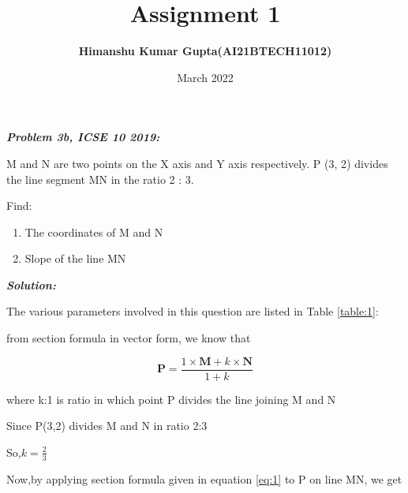 \documentclass[journal,12pt,twocolumn]{IEEEtran}
\begin{document}
\newcommand{\myvec}[1]{\ensuremath{\begin{pmatrix}#1\end{pmatrix}}}

\let\vec\mathbf


\title{Assignment 1}
\author{\textbf{Himanshu Kumar Gupta(AI21BTECH11012)}}
\maketitle
\date {March 2022}


\textbf{\textit{Problem 3b, ICSE 10 2019:}}


 M and N are two points on the X axis and Y axis respectively. 
P (3, 2) divides the line segment MN in the ratio 2 : 3.

Find:
\begin{enumerate}
    \item The coordinates of M and N
    \item Slope of the line MN
\end{enumerate}

\textbf{\textit{Solution:}}

	The various parameters involved in this question are listed in Table \eqref{table:1}:
	\begin{table}[ht!]
		
		\vspace{5pt}
		\caption{}
		\label{table:1}	
	\end{table}

  from section formula in vector form, we know that
  
  \begin{equation}
  \label{eq:1}
\vec{P}=\frac{1\times \vec{M} +k\times \vec{N}}{1+k}     
  \end{equation}
 
  where k:1 is ratio in which point P divides the line joining M and N
  
Since P(3,2) divides M and N in ratio 2:3

So,$ k=\frac{2}{3}$

Now,by applying section formula given in equation \eqref{eq:1} to P on line MN, we get
\end{document}
